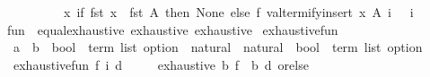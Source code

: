 \begin{isabellebody}
\ \ \ \ \ \ \ \ \ \ {\isacharparenleft}{\kern0pt}{\isasymlambda}x{\isachardot}{\kern0pt}\ if\ fst\ x\ {\isasymin}\ fst\ A\ then\ None\ else\ f\ {\isacharparenleft}{\kern0pt}valtermify{\isacharunderscore}{\kern0pt}insert\ x\ A{\isacharparenright}{\kern0pt}{\isacharparenright}{\kern0pt}\ {\isacharparenleft}{\kern0pt}i\ {\isacharminus}{\kern0pt}\ {}{\isacharparenright}{\kern0pt}{\isacharparenright}{\kern0pt}\ {\isacharparenleft}{\kern0pt}i\ {\isacharminus}{\kern0pt}\ {}{\isacharparenright}{\kern0pt}{\isacharparenright}{\kern0pt}{\isachardoublequoteclose}\isanewline
\isanewline
{}\isamarkupfalse%
%
\isadelimproof
\ %
\endisadelimproof
%
\isatagproof
\isacommand{{\isachardot}{\kern0pt}{\isachardot}{\kern0pt}}\isamarkupfalse%
%
\endisatagproof
{\isafoldproof}%
%
\isadelimproof
%
\endisadelimproof
\isanewline
\isanewline
{}\isamarkupfalse%
\isanewline
\isanewline
{}\isamarkupfalse%
\ {\isachardoublequoteopen}fun{\isachardoublequoteclose}\ {\isacharcolon}{\kern0pt}{\isacharcolon}{\kern0pt}\ {\isacharparenleft}{\kern0pt}{\isachardoublequoteopen}{\isacharbraceleft}{\kern0pt}equal{\isacharcomma}{\kern0pt}exhaustive{\isacharbraceright}{\kern0pt}{\isachardoublequoteclose}{\isacharcomma}{\kern0pt}\ exhaustive{\isacharparenright}{\kern0pt}\ exhaustive\isanewline
{}\isanewline
\isanewline
{}\isamarkupfalse%
\ exhaustive{\isacharunderscore}{\kern0pt}fun{\isacharprime}{\kern0pt}\ {\isacharcolon}{\kern0pt}{\isacharcolon}{\kern0pt}\isanewline
\ \ {\isachardoublequoteopen}{\isacharparenleft}{\kern0pt}{\isacharparenleft}{\kern0pt}{\isacharprime}{\kern0pt}a\ {\isasymRightarrow}\ {\isacharprime}{\kern0pt}b{\isacharparenright}{\kern0pt}\ {\isasymRightarrow}\ {\isacharparenleft}{\kern0pt}bool\ {\isasymtimes}\ term\ list{\isacharparenright}{\kern0pt}\ option{\isacharparenright}{\kern0pt}\ {\isasymRightarrow}\ natural\ {\isasymRightarrow}\ natural\ {\isasymRightarrow}\ {\isacharparenleft}{\kern0pt}bool\ {\isasymtimes}\ term\ list{\isacharparenright}{\kern0pt}\ option{\isachardoublequoteclose}\isanewline
{}\isanewline
\ \ {\isachardoublequoteopen}exhaustive{\isacharunderscore}{\kern0pt}fun{\isacharprime}{\kern0pt}\ f\ i\ d\ {\isacharequal}{\kern0pt}\isanewline
\ \ \ \ {\isacharparenleft}{\kern0pt}exhaustive\ {\isacharparenleft}{\kern0pt}{\isasymlambda}b{\isachardot}{\kern0pt}\ f\ {\isacharparenleft}{\kern0pt}{\isasymlambda}{\isacharunderscore}{\kern0pt}{\isachardot}{\kern0pt}\ b{\isacharparenright}{\kern0pt}{\isacharparenright}{\kern0pt}\ d{\isacharparenright}{\kern0pt}\ orelse\isanewline

\end{isabellebody}
